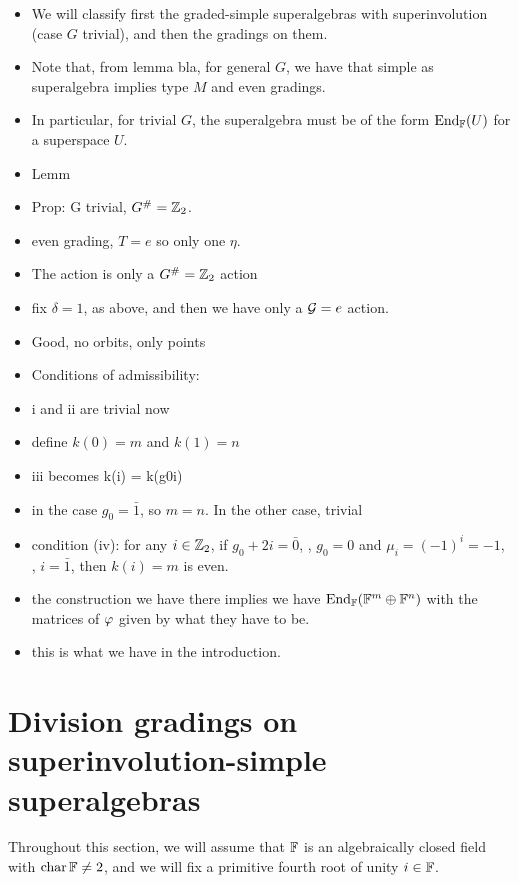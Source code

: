 \begin{itemize}
    \item We will classify first the graded-simple superalgebras with superinvolution (case $G$ trivial), and then the gradings on them.
    \item Note that, from lemma bla, for general $G$, we have that simple as superalgebra implies type $M$ and even gradings.
    \item In particular, for trivial $G$, the superalgebra must be of the form $\operatorname{End}_{\mathbb{F}} (U)$ for a superspace $U$.
    \item Lemm
    \item Prop: G trivial, $G^\# = \mathbb{Z}_2$.
    \item even grading, $T = e$ so only one $\eta$.
    \item The action is only a $G^\# = \mathbb{Z}_2$ action
    \item fix $\delta = 1$, as above, and then we have only a $\mathcal G = e$ action.
    \item Good, no orbits, only points
    \item Conditions of admissibility:
    \item i and ii are trivial now
    \item define $k(0) = m$ and $k(1) = n$
    \item iii becomes k(i) = k(g0i)
    \item in the case $g_0 = \bar 1$, so $m = n$. In the other case, trivial
    \item condition (iv): for any $i \in \mathbb{Z}_2$, if $g_0 + 2i = \bar 0$, \ie, $g_0 = 0$ and $\mu_i = (-1)^{i} = -1$, \ie, $i = \bar 1$, then $k(i) = m$ is even.
    \item the construction we have there implies we have $\operatorname{End}_{\mathbb{F}} (\mathbb{F}^m \oplus \mathbb{F}^n)$ with the matrices of $\varphi$ given by what they have to be.
    \item this is what we have in the introduction.
\end{itemize}



\section{Division gradings on superinvolution-simple\texorpdfstring{\\}{} superalgebras}\label{sec:div-grads-on-sinv-simple}

Throughout this section, we will assume that $\mathbb{F}$ is an algebraically closed field with $\operatorname{char} \mathbb{F} \neq 2$, and we will fix a primitive fourth root of unity $i \in \mathbb{F}$.

